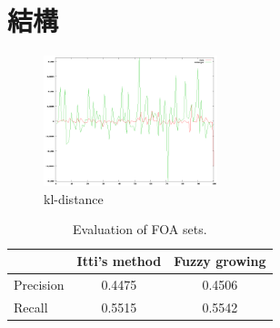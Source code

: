 \section{結構}

\begin{figure}
\centering
\includegraphics[width=0.45\textwidth]{images/kl}
\caption{kl-distance}
\label{kl}
\end{figure}

\begin{table}[t]
\begin{center}
\begin{tabular}{lcc}

\hline
                    &  {\small Itti's method}     & {\small Fuzzy growing}    \\
\hline
{\small Precision}           &  0.4475    & 0.4506 \\
{\small Recall}              &  0.5515    & 0.5542 \\
\hline

\end{tabular}
\caption[Evaluation of FOA sets]{\small Evaluation of FOA sets. } \label{t:FOA}
\end{center}
\end{table}
